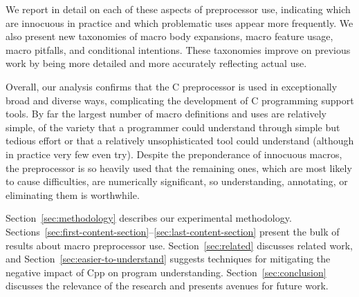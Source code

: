 \documentclass[10pt]{article}
\begin{document}
We report in detail on each of these aspects of preprocessor use,
indicating which are innocuous in practice and which problematic
uses appear more frequently.  We also present new taxonomies of macro body
expansions, macro feature usage, macro pitfalls, and conditional
intentions.  These taxonomies improve on previous work by being more
detailed and more accurately reflecting actual use.

Overall, our analysis confirms that the C preprocessor is used in
exceptionally broad and diverse ways, complicating the development of C
programming support tools.  By far the largest number of macro definitions
and uses are relatively simple, of the variety that a programmer could
understand through simple but tedious effort or that a relatively
unsophisticated tool could understand (although in practice very few even
try).  Despite the preponderance of innocuous macros, the preprocessor is
so heavily used that the remaining ones, which are most likely to cause
difficulties, are numerically significant, so understanding, annotating, or
eliminating them is worthwhile.

Section~\ref{sec:methodology} describes our experimental methodology.
Sections~\ref{sec:first-content-section}--\ref{sec:last-content-section}
present the bulk of results about macro preprocessor use.
Section~\ref{sec:related} discusses related work, and
Section~\ref{sec:easier-to-understand} suggests techniques for mitigating
the negative impact of Cpp on program understanding.
Section~\ref{sec:conclusion} discusses the relevance of the research and
presents avenues for future work.

\end{document}
